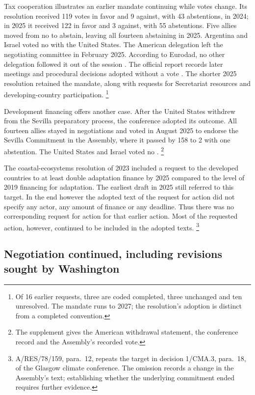 \documentclass[12pt,authoryear]{elsarticle}
\begin{document}
Tax cooperation illustrates an earlier mandate continuing while votes change. Its resolution received 119 votes in favor and 9 against, with 43 abstentions, in 2024; in 2025 it received 122 in favor and 3 against, with 55 abstentions. Five allies moved from no to abstain, leaving all fourteen abstaining in 2025. Argentina and Israel voted no with the United States. The American delegation left the negotiating committee in February 2025. According to Eurodad, no other delegation followed it out of the session \citep{eurodad:2025:walkout}. The official report records later meetings and procedural decisions adopted without a vote \citep{un:2025:taxcommitteereport}. The shorter 2025 resolution retained the mandate, along with requests for Secretariat resources and developing-country participation. \footnote{Of 16 earlier requests, three are coded completed, three unchanged and ten unresolved. The mandate runs to 2027; the resolution's adoption is distinct from a completed convention.}

Development financing offers another case. After the United States withdrew from the Sevilla preparatory process, the conference adopted its outcome. All fourteen allies stayed in negotiations and voted in August 2025 to endorse the Sevilla Commitment in the Assembly, where it passed by 158 to 2 with one abstention. The United States and Israel voted no \citep{usun:2025:ffd4withdrawal,un:2025:sevillavote}. \footnote{The supplement gives the American withdrawal statement, the conference record and the Assembly's recorded vote.}

The coastal-ecosystems resolution of 2023 included a request to the developed countries to at least double adaptation finance by 2025 compared to the level of 2019 financing for adaptation. The earliest draft in 2025 still referred to this target. In the end however the adopted text of the request for action did not specify any actor, any amount of finance or any deadline. Thus there was no corresponding request for action for that earlier action. Most of the requested action, however, continued to be included in the adopted texts. \footnote{A/RES/78/159, para.~12, repeats the target in decision 1/CMA.3, para.~18, of the Glasgow climate conference. The omission records a change in the Assembly's text; establishing whether the underlying commitment ended requires further evidence.}

\subsection{Negotiation continued, including revisions sought by Washington}
\end{document}
